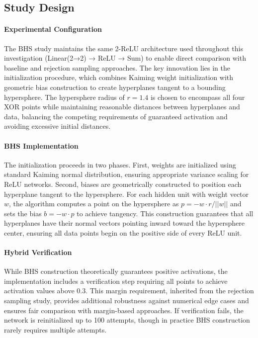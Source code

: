 
\subsection*{Study Design}

\paragraph{Experimental Configuration}
The BHS study maintains the same 2-ReLU architecture used throughout this investigation (Linear(2→2) → ReLU → Sum) to enable direct comparison with baseline and rejection sampling approaches. The key innovation lies in the initialization procedure, which combines Kaiming weight initialization with geometric bias construction to create hyperplanes tangent to a bounding hypersphere. The hypersphere radius of $r=1.4$ is chosen to encompass all four XOR points while maintaining reasonable distances between hyperplanes and data, balancing the competing requirements of guaranteed activation and avoiding excessive initial distances.

\paragraph{BHS Implementation}
The initialization proceeds in two phases. First, weights are initialized using standard Kaiming normal distribution, ensuring appropriate variance scaling for ReLU networks. Second, biases are geometrically constructed to position each hyperplane tangent to the hypersphere. For each hidden unit with weight vector $w$, the algorithm computes a point on the hypersphere as $p = -w \cdot r / ||w||$ and sets the bias $b = -w \cdot p$ to achieve tangency. This construction guarantees that all hyperplanes have their normal vectors pointing inward toward the hypersphere center, ensuring all data points begin on the positive side of every ReLU unit.

\paragraph{Hybrid Verification}
While BHS construction theoretically guarantees positive activations, the implementation includes a verification step requiring all points to achieve activation values above 0.3. This margin requirement, inherited from the rejection sampling study, provides additional robustness against numerical edge cases and ensures fair comparison with margin-based approaches. If verification fails, the network is reinitialized up to 100 attempts, though in practice BHS construction rarely requires multiple attempts.

